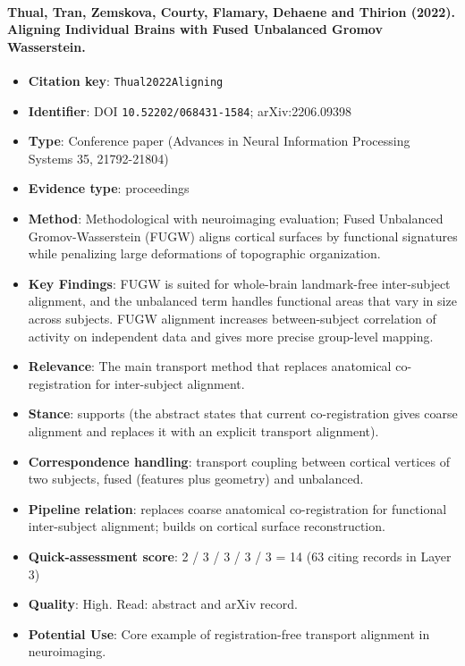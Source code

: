 \documentclass[journal,onecolumn]{IEEEtran}
\begin{document}
\paragraph{Thual, Tran, Zemskova, Courty, Flamary, Dehaene and Thirion (2022). Aligning Individual Brains with Fused Unbalanced Gromov Wasserstein.~\cite{Thual2022Aligning}}\mbox{}

\begin{itemize}

\item{} \textbf{Citation key}: \texttt{Thual2022Aligning}

\item{} \textbf{Identifier}: DOI \nolinkurl{10.52202/068431-1584}; arXiv:2206.09398

\item{} \textbf{Type}: Conference paper (Advances in Neural Information Processing Systems 35, 21792-21804)

\item{} \textbf{Evidence type}: proceedings

\item{} \textbf{Method}: Methodological with neuroimaging evaluation; Fused Unbalanced Gromov-Wasserstein (FUGW) aligns cortical surfaces by functional signatures while penalizing large deformations of topographic organization.

\item{} \textbf{Key Findings}: FUGW is suited for whole-brain landmark-free inter-subject alignment, and the unbalanced term handles functional areas that vary in size across subjects. FUGW alignment increases between-subject correlation of activity on independent data and gives more precise group-level mapping.

\item{} \textbf{Relevance}: The main transport method that replaces anatomical co-registration for inter-subject alignment.

\item{} \textbf{Stance}: supports (the abstract states that current co-registration gives coarse alignment and replaces it with an explicit transport alignment).

\item{} \textbf{Correspondence handling}: transport coupling between cortical vertices of two subjects, fused (features plus geometry) and unbalanced.

\item{} \textbf{Pipeline relation}: replaces coarse anatomical co-registration for functional inter-subject alignment; builds on cortical surface reconstruction.

\item{} \textbf{Quick-assessment score}: 2 / 3 / 3 / 3 / 3 = 14 (63 citing records in Layer 3)

\item{} \textbf{Quality}: High. Read: abstract and arXiv record.

\item{} \textbf{Potential Use}: Core example of registration-free transport alignment in neuroimaging.

\end{itemize}
\end{document}
